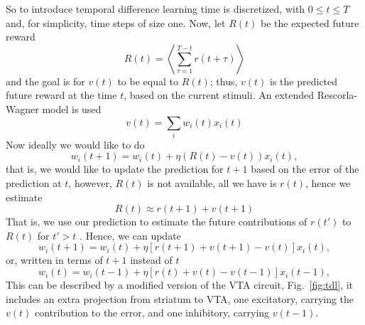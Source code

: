 \documentclass[11pt,a4paper]{scrartcl}
\begin{document}
So to introduce temporal difference learning time is discretized, with
$0\le t\le T$ and, for simplicity, time steps of size one. Now, let $R(t)$ be the expected future reward
\begin{equation}
R(t)=\left\langle \sum_{\tau=1}^{T-t}r(t+\tau)\right\rangle
\end{equation}
and the goal is for $v(t)$ to be equal to $R(t)$; thus, $v(t)$ is the
predicted future reward at the time $t$, based on the current stimuli. An extended Rescorla-Wagner model is used
\begin{equation}
v(t)=\sum_i w_i(t)x_i(t)
\end{equation}
Now ideally we would like to do
\begin{equation}
w_i(t+1)=w_i(t)+\eta(R(t)-v(t))x_i(t),
\end{equation}
that is, we would like to update the prediction for $t+1$ based on the error of the prediction at $t$, however, $R(t)$ is not available, all we have is $r(t)$, hence we estimate
\begin{equation}
R(t)\approx r(t+1)+v(t+1)
\end{equation}
That is, we use our prediction to estimate the future contributions of $r(t')$ to $R(t)$ for $t'>t$ \cite{Barto1995a}. Hence, we can update
\begin{equation}
w_i(t+1)=w_i(t)+\eta[r(t+1)+v(t+1)-v(t)]x_i(t),
\end{equation}
or, written in terms of $t+1$ instead of $t$
\begin{equation}
w_i(t)=w_i(t-1)+\eta[r(t)+v(t)-v(t-1)]x_i(t-1),
\end{equation}
This can be described by a modified version of the VTA circuit, Fig.~\ref{fig:tdl}, it includes an extra projection from striatum to VTA, one excitatory, carrying the $v(t)$ contribution to the error, and one inhibitory, carrying $v(t-1)$.
\end{document}
